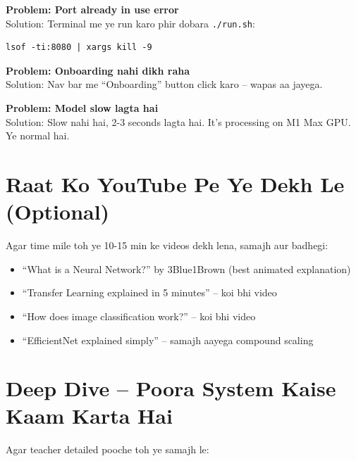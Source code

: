 \documentclass[11pt,a4paper]{article}
\begin{document}
\begin{warnbox}
\textbf{Problem: Port already in use error}\\
Solution: Terminal me ye run karo phir dobara \texttt{./run.sh}:
\begin{verbatim}
lsof -ti:8080 | xargs kill -9
\end{verbatim}
\end{warnbox}

\begin{warnbox}
\textbf{Problem: Onboarding nahi dikh raha}\\
Solution: Nav bar me ``Onboarding'' button click karo -- wapas aa jayega.
\end{warnbox}

\begin{warnbox}
\textbf{Problem: Model slow lagta hai}\\
Solution: Slow nahi hai, 2-3 seconds lagta hai. It's processing on M1 Max GPU. Ye normal hai.
\end{warnbox}

\section{Raat Ko YouTube Pe Ye Dekh Le (Optional)}

Agar time mile toh ye 10-15 min ke videos dekh lena, samajh aur badhegi:

\begin{itemize}[leftmargin=1.2cm]
\item ``What is a Neural Network?'' by 3Blue1Brown (best animated explanation)
\item ``Transfer Learning explained in 5 minutes'' -- koi bhi video
\item ``How does image classification work?'' -- koi bhi video
\item ``EfficientNet explained simply'' -- samajh aayega compound scaling
\end{itemize}

\section{Deep Dive -- Poora System Kaise Kaam Karta Hai}

Agar teacher detailed pooche toh ye samajh le:
\end{document}
